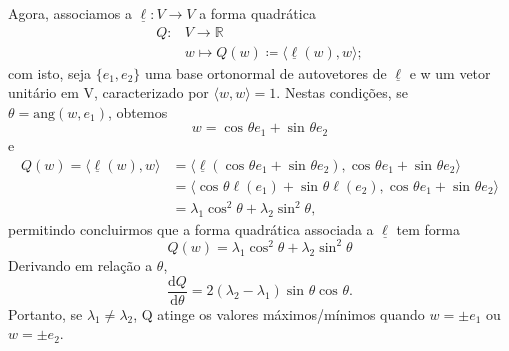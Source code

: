 \documentclass[../differential_geometry.tex]{subfiles}
\begin{document}
Agora, associamos a \(\underline{\ell }:V\rightarrow V\) a forma quadrática
\begin{align*}
	Q: & V\rightarrow \mathbb{R}                                             \\
	   & w\longmapsto Q(w)\coloneqq \langle \underline{\ell }(w), w \rangle;
\end{align*}
com isto, seja \(\{e_1, e_2\}\) uma base ortonormal de autovetores de \(\underline{\ell }\) e w um vetor unitário em V, caracterizado por \(\langle w, w \rangle = 1\). Nestas condições, se \(\theta = \mathrm{ang}(w, e_1)\), obtemos
\[
	w = \cos^{}{\theta } e_1 + \sin^{}{\theta }e_2
\]
e
\begin{align*}
	Q(w) = \langle \underline{\ell }(w), w \rangle & =\langle \underline{\ell }(\cos^{}{\theta }e_1 + \sin^{}{\theta }e_2), \cos^{}{\theta }e_1 + \sin^{}{\theta }e_2 \rangle \\
	                                               & =\langle \cos^{}{\theta }\ell (e_1)+\sin^{}{\theta }\ell (e_2), \cos^{}{\theta }e_1 + \sin^{}{\theta }e_2 \rangle        \\
	                                               & =\lambda_1 \cos^{2}{\theta } + \lambda_2\sin^{2}{\theta },
\end{align*}
permitindo concluirmos que a forma quadrática associada a \(\underline{\ell }\) tem forma
\[
	\boxed{Q(w) = \lambda_1 \cos^{2}{\theta } + \lambda_2 \sin^{2}{\theta }}
\]
Derivando em relação a \(\theta \),
\[
	\frac{\mathrm{d}Q}{\mathrm{d}\theta }=2 (\lambda_2 - \lambda_1)\sin^{}{\theta }\cos^{}{\theta }.
\]
Portanto, se \(\lambda_1\neq \lambda_2\), Q atinge os valores máximos/mínimos quando \(w = \pm e_1\) ou \(w=\pm e_2\).
\end{document}

